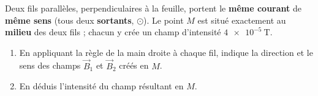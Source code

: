 \documentclass[11pt,a4paper]{article}
\newcommand{\vv}[1]{\vec{#1}}\newcommand{\ds}{\displaystyle}
\begin{document}
\begin{exo}
Deux fils parallèles, perpendiculaires à la feuille, portent le \textbf{même courant} de \textbf{même
sens} (tous deux \textbf{sortants}, $\odot$). Le point $M$ est situé exactement au \textbf{milieu} des
deux fils ; chacun y crée un champ d'intensité $\qty{4e-5}{\tesla}$.
\begin{center}
\end{center}
\begin{enumerate}[label=\alph*)]
  \item En appliquant la règle de la main droite à chaque fil, indique la direction et le sens des
        champs $\vv{B}_1$ et $\vv{B}_2$ créés en $M$.
  \item En déduis l'intensité du champ résultant en $M$.
\end{enumerate}
\end{exo}
\end{document}
